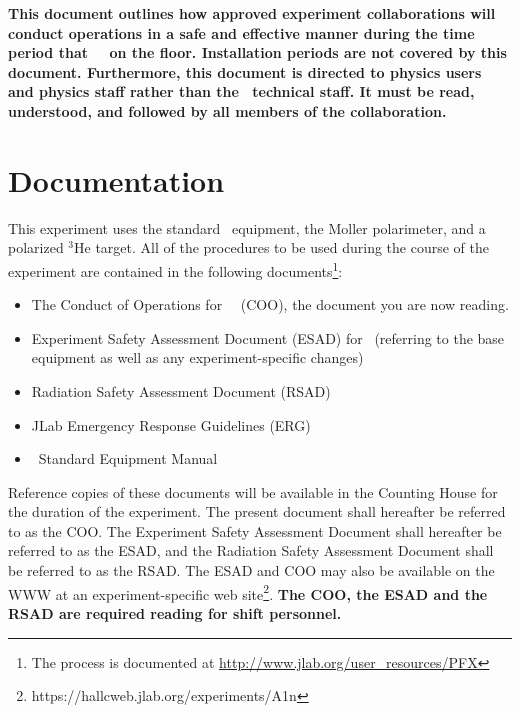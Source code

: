 \documentclass[10pt]{article}
\begin{document}
{\bf This document outlines how approved experiment collaborations will conduct
operations in a safe and effective manner during the time period that
\EXPTS\ \BETENSE\ on the floor. Installation
periods are not covered by this document.
Furthermore, this document is directed to physics users and
physics staff rather than the \HALL\ technical staff.  It must be read,
understood, and followed by all members of the collaboration. }

\section{Documentation}

This experiment uses the standard \HALL\ equipment, the Moller polarimeter, and a polarized
$^3$He target.
All of the procedures to be used during the course of the experiment are contained in the following
documents\footnote{The process is documented at \url{http://www.jlab.org/user_resources/PFX} }:

\begin{itemize}

\item  The Conduct of Operations for \HALL\ \EXPTS\
 (COO), the document you are now reading.

\item   Experiment Safety Assessment Document (ESAD)
for \EXPTS\ (referring to the base equipment as well as any
experiment-specific changes)

\item Radiation Safety Assessment Document (RSAD)

\item JLab Emergency Response Guidelines (ERG)

\item \HALL\ Standard Equipment Manual

\end{itemize}


Reference copies of these documents will be available in the Counting
House for the duration of the experiment. The present document shall
hereafter be referred to as the COO. The Experiment Safety Assessment
Document shall hereafter be referred to as the ESAD, and the
Radiation Safety Assessment Document shall be referred to as the RSAD.
The ESAD and COO may also be available on the WWW at an experiment-specific
web site\footnote{https://hallcweb.jlab.org/experiments/A1n}.
{\bf The COO, the ESAD and the RSAD are required reading for
shift personnel.}
\end{document}
